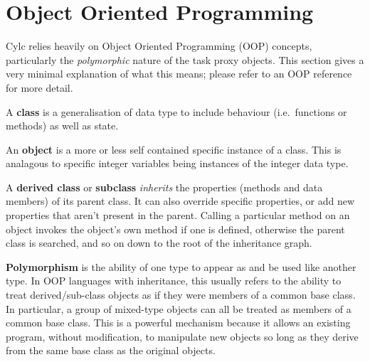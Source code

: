 \documentclass[11pt,a4paper]{article}
\begin{document}

\pagebreak
\appendix

\section{Object Oriented Programming}

Cylc relies heavily on Object Oriented Programming (OOP) concepts,
particularly the {\em polymorphic} nature of the task proxy objects.
This section gives a very minimal explanation of what this means;
please refer to an OOP reference for more detail.

A {\bf class} is a generalisation of data type to include behaviour
(i.e.\ functions or methods) as well as state. 


An {\bf object} is a more or less self contained specific instance
of a class. This is analagous to specific integer variables being 
instances of the integer data type.

A {\bf derived class} or {\bf subclass} {\em inherits} the properties
(methods and data members) of its parent class. It can also override
specific properties, or add new properties that aren't present in the
parent. Calling a particular method on an object invokes the object's
own method if one is defined, otherwise the parent class is searched,
and so on down to the root of the inheritance graph. 



{\bf Polymorphism} is the ability of one type to appear as and be used
like another type.  In OOP languages with inheritance, this usually
refers to the ability to treat derived/sub-class objects as if they were
members of a common base class. In particular, a group of mixed-type
objects can all be treated as members of a common base class. 
This is a powerful mechanism because it allows an existing program,
without modification, to manipulate new objects so long as they 
derive from the same base class as the original objects.
\end{document}
